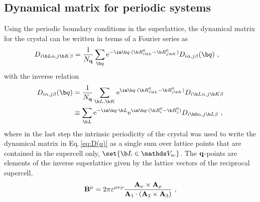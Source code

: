 
\subsection{Dynamical matrix for periodic systems}
%
%
Using the periodic boundary conditions in the superlattice, the dynamical matrix for the crystal can be written in terms of a Fourier series as
\begin{align}
	D_{i \b L \alpha, j \b K \beta}  
		& = \frac{1}{N_{\bf q}} \sum_{\b q} {\rm e}^{- \im \b q \cdot (\b R_{i \b L}^0 - \b R_{j \b K}^0)} {D}_{i \alpha, j \beta} (\b q)~,
	\label{eq:D_{iLa}_0}
\end{align}
with the inverse relation
\begin{align}
	{D}_{i \alpha, j \beta} (\b q) 	
		&= \frac{1}{N_{\bf q}} 
			\sum_{\b L, \b K} 
			{\rm e}^{\im \b q \cdot (\b R^0_{i \b L} - \b R^0_{j \b K})} {D}_{i \b L \alpha, j \b K \beta} \\
		&\equiv \sum_{\b L} {\rm e}^{- \im \b q \cdot \b L} {\rm e}^{\im \b q \cdot (\b R_i^0 - \b R_j^0)} {D}_{i \b 0 \alpha, j \b L \beta}~,
	\label{eq:D(q)}
\end{align}
where in the last step the intrinsic periodicity of the crystal was used
to write the dynamical matrix in Eq.\,\eqref{eq:D(q)} as a single sum over lattice points that are contained in the supercell only, $\set{\b L \in \mathds V_{\rm sc}}$.
The $\bf q$-points are elements of the inverse superlattice given by the lattice vectors of the reciprocal supercell,
\begin{align}
{\bf B}^\mu
= 2 \pi \varepsilon^{\mu \nu \rho} \frac{{\bf A}_\nu \times {\bf A}_\rho}{{\bf A}_1 \cdot ({\bf A}_2 \times {\bf A}_3)} ~,
\end{align}
